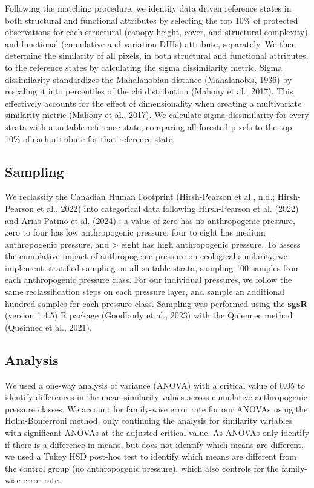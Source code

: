 \documentclass[
]{agujournal2019}
\begin{document}
Following the matching procedure, we identify data driven reference
states in both structural and functional attributes by selecting the top
10\% of protected observations for each structural (canopy height,
cover, and structural complexity) and functional (cumulative and
variation DHIs) attribute, separately. We then determine the similarity
of all pixels, in both structural and functional attributes, to the
reference states by calculating the sigma dissimilarity metric. Sigma
dissimilarity standardizes the Mahalanobian distance (Mahalanobis, 1936)
by rescaling it into percentiles of the chi distribution (Mahony et al.,
2017). This effectively accounts for the effect of dimensionality when
creating a multivariate similarity metric (Mahony et al., 2017). We
calculate sigma dissimilarity for every strata with a suitable reference
state, comparing all forested pixels to the top 10\% of each attribute
for that reference state.

\subsection{Sampling}\label{sampling}

We reclassify the Canadian Human Footprint (Hirsh-Pearson et al., n.d.;
Hirsh-Pearson et al., 2022) into categorical data following
Hirsh-Pearson et al. (2022) and Arias-Patino et al. (2024) : a value of
zero has no anthropogenic pressure, zero to four has low anthropogenic
pressure, four to eight has medium anthropogenic pressure, and
\textgreater{} eight has high anthropogenic pressure. To assess the
cumulative impact of anthropogenic pressure on ecological similarity, we
implement stratified sampling on all suitable strata, sampling 100
samples from each anthropogenic pressure class. For our individual
pressures, we follow the same reclassification steps on each pressure
layer, and sample an additional hundred samples for each pressure class.
Sampling was performed using the \textbf{sgsR} (version 1.4.5) R package
(Goodbody et al., 2023) with the Quiennec method (Queinnec et al.,
2021).

\subsection{Analysis}\label{analysis}

We used a one-way analysis of variance (ANOVA) with a critical value of
0.05 to identify differences in the mean similarity values across
cumulative anthropogenic pressure classes. We account for family-wise
error rate for our ANOVAs using the Holm-Bonferroni method, only
continuing the analysis for similarity variables with significant ANOVAs
at the adjusted critical value. As ANOVAs only identify if there is a
difference in means, but does not identify which means are different, we
used a Tukey HSD post-hoc test to identify which means are different
from the control group (no anthropogenic pressure), which also controls
for the family-wise error rate.
\end{document}
